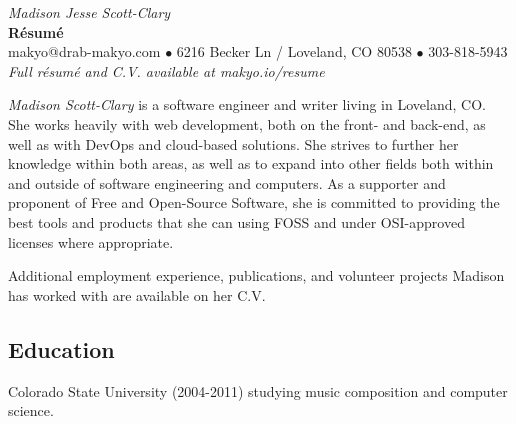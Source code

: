 \documentclass[letterpaper]{memoir}
\begin{document}
\begin{center}
  {\huge \textit{\color{titlegreydark} Madison Jesse Scott-Clary}}\\
  {\Huge{\textbf{R\'esum\'e}}}\\
  {\color{titlegrey} makyo@drab-makyo.com $\bullet$ 6216 Becker Ln / Loveland, CO 80538 $\bullet$ 303-818-5943}\\
  {\small \color{titlegrey} \textit{Full r\'esum\'e and C.V. available at makyo.io/resume}}
\end{center}

\textit{Madison Scott-Clary} is a software engineer and writer living in
Loveland, CO. She works heavily with web development, both on the front-
and back-end, as well as with DevOps and cloud-based solutions. She
strives to further her knowledge within both areas, as well as to expand
into other fields both within and outside of software engineering and
computers. As a supporter and proponent of Free and Open-Source
Software, she is committed to providing the best tools and products that
she can using FOSS and under OSI-approved licenses where appropriate.

%


Additional employment experience, publications, and volunteer projects
Madison has worked with are available on her C.V.

\subsection{Education}\label{education}

\begin{description}
\tightlist
\item[University] \hfill
Colorado State University (2004-2011) studying music composition and
computer science.
\end{description}
\end{document}
